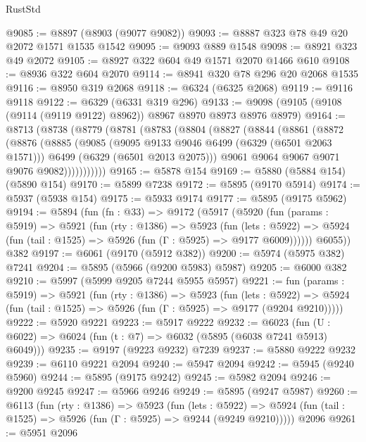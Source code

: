 \begin{lexlean}{RustStd}
\begin{coremodule}
{\begin{coremodule}
{{{{{{{{{{{{{{{{{{{{{{{{{{{{{{{{{{{@9085 := @8897 (@8903 (@9077 @9082))
@9093 := @8887 @323 @78 @49 @20 @2072 @1571 @1535 @1542
@9095 := @9093 @889 @1548
@9098 := @8921 @323 @49 @2072
@9105 := @8927 @322 @604 @49 @1571 @2070 @1466 @610
@9108 := @8936 @322 @604 @2070
@9114 := @8941 @320 @78 @296 @20 @2068 @1535
@9116 := @8950 @319 @2068
@9118 := @6324 (@6325 @2068)
@9119 := @9116 @9118
@9122 := @6329 (@6331 @319 @296)
@9133 := @9098 (@9105 (@9108 (@9114 (@9119 @9122) @8962)) @8967 @8970 @8973 @8976 @8979)
@9164 := @8713
    (@8738
      (@8779
        (@8781
          (@8783
            (@8804
              (@8827
                (@8844
                  (@8861
                    (@8872
                      (@8876
                        (@8885
                          (@9085
                            (@9095 @9133 @9046 @6499 (@6329 (@6501 @2063 @1571)))
                            @6499
                            (@6329 (@6501 @2013 @2075)))
                          @9061
                          @9064
                          @9067
                          @9071
                          @9076
                          @9082)))))))))))
@9165 := @5878 @154
@9169 := @5880 (@5884 @154) (@5890 @154)
@9170 := @5899 @7238
@9172 := @5895 (@9170 @5914)
@9174 := @5937 (@5938 @154)
@9175 := @5933 @9174
@9177 := @5895 (@9175 @5962)
@9194 := @5894
    (fun (fn : @33) =>
    @9172
      (@5917
        (@5920
          (fun (params : @5919) =>
          @5921
            (fun (rty : @1386) =>
            @5923
              (fun (lets : @5922) =>
              @5924 (fun (tail : @1525) => @5926 (fun (Γ : @5925) => @9177 @6009))))))
        @6055))
    @382
@9197 := @6061 (@9170 (@5912 @382))
@9200 := @5974 (@5975 @382) @7241
@9204 := @5895 (@5966 (@9200 @5983) @5987)
@9205 := @6000 @382
@9210 := @5997 (@5999 @9205 @7244 @5955 @5957)
@9221 := fun (params : @5919) =>
  @5921
    (fun (rty : @1386) =>
    @5923
      (fun (lets : @5922) =>
      @5924 (fun (tail : @1525) => @5926 (fun (Γ : @5925) => @9177 (@9204 @9210)))))
@9222 := @5920 @9221
@9223 := @5917 @9222
@9232 := @6023 (fun (U : @6022) => @6024 (fun (t : @7) => @6032 (@5895 (@6038 @7241 @5913) @6049)))
@9235 := @9197 (@9223 @9232) @7239
@9237 := @5880 @9222 @9232
@9239 := @6110 @9221 @2094
@9240 := @5947 @2094
@9242 := @5945 (@9240 @5960)
@9244 := @5895 (@9175 @9242)
@9245 := @5982 @2094
@9246 := @9200 @9245
@9247 := @5966 @9246
@9249 := @5895 (@9247 @5987)
@9260 := @6113
    (fun (rty : @1386) =>
    @5923
      (fun (lets : @5922) =>
      @5924 (fun (tail : @1525) => @5926 (fun (Γ : @5925) => @9244 (@9249 @9210)))))
    @2096
@9261 := @5951 @2096
}}}}}}}}}}}}}}}}}}}}}}}}}}}}}}}}}}}
\end{coremodule}}
\end{coremodule}
\end{lexlean}
